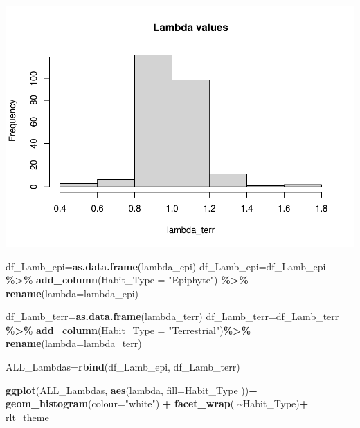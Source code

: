 \documentclass[
]{book}
\newenvironment{Shaded}{\begin{snugshade}}{\end{snugshade}}
\newcommand{\AttributeTok}[1]{\textcolor[rgb]{0.13,0.29,0.53}{#1}}
\newcommand{\FunctionTok}[1]{\textcolor[rgb]{0.13,0.29,0.53}{\textbf{#1}}}
\newcommand{\NormalTok}[1]{#1}
\newcommand{\OtherTok}[1]{\textcolor[rgb]{0.56,0.35,0.01}{#1}}
\newcommand{\SpecialCharTok}[1]{\textcolor[rgb]{0.81,0.36,0.00}{\textbf{#1}}}
\newcommand{\StringTok}[1]{\textcolor[rgb]{0.31,0.60,0.02}{#1}}
\theoremstyle{definition}
\theoremstyle{definition}
\theoremstyle{definition}
\theoremstyle{definition}
\theoremstyle{remark}
\begin{document}
\includegraphics{Diagnostico_Poblacional_files/figure-latex/chap16_21-2.pdf}

\begin{Shaded}
\begin{Highlighting}[]
\NormalTok{df\_Lamb\_epi}\OtherTok{=}\FunctionTok{as.data.frame}\NormalTok{(lambda\_epi)}
\NormalTok{df\_Lamb\_epi}\OtherTok{=}\NormalTok{df\_Lamb\_epi }\SpecialCharTok{\%\textgreater{}\%} 
  \FunctionTok{add\_column}\NormalTok{(}\AttributeTok{Habit\_Type =} \StringTok{"Epiphyte"}\NormalTok{) }\SpecialCharTok{\%\textgreater{}\%} 
  \FunctionTok{rename}\NormalTok{(}\AttributeTok{lambda=}\NormalTok{lambda\_epi)}


\NormalTok{df\_Lamb\_terr}\OtherTok{=}\FunctionTok{as.data.frame}\NormalTok{(lambda\_terr)}
\NormalTok{df\_Lamb\_terr}\OtherTok{=}\NormalTok{df\_Lamb\_terr }\SpecialCharTok{\%\textgreater{}\%} 
  \FunctionTok{add\_column}\NormalTok{(}\AttributeTok{Habit\_Type =} \StringTok{"Terrestrial"}\NormalTok{)}\SpecialCharTok{\%\textgreater{}\%} 
  \FunctionTok{rename}\NormalTok{(}\AttributeTok{lambda=}\NormalTok{lambda\_terr)}


\NormalTok{ALL\_Lambdas}\OtherTok{=}\FunctionTok{rbind}\NormalTok{(df\_Lamb\_epi, df\_Lamb\_terr)}
\end{Highlighting}
\end{Shaded}

\begin{Shaded}
\begin{Highlighting}[]
\FunctionTok{ggplot}\NormalTok{(ALL\_Lambdas, }\FunctionTok{aes}\NormalTok{(lambda, }\AttributeTok{fill=}\NormalTok{Habit\_Type ))}\SpecialCharTok{+}
  \FunctionTok{geom\_histogram}\NormalTok{(}\AttributeTok{colour=}\StringTok{"white"}\NormalTok{) }\SpecialCharTok{+} 
  \FunctionTok{facet\_wrap}\NormalTok{( }\SpecialCharTok{\textasciitilde{}}\NormalTok{Habit\_Type)}\SpecialCharTok{+}
\NormalTok{  rlt\_theme}
\end{Highlighting}
\end{Shaded}
\end{document}
